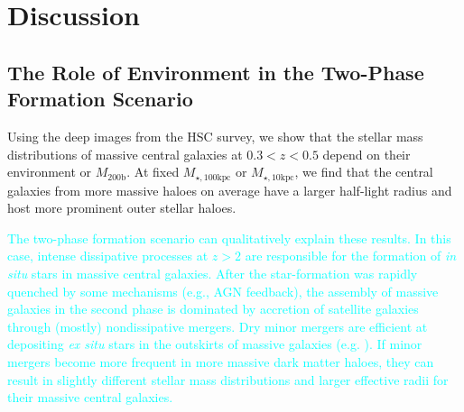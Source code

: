 \documentclass[a4paper,fleqn,usenatbib]{mnras}
\def\mhalo{{$M_{\mathrm{200b}}$}}
\def\minn{{$M_{\star,10\mathrm{kpc}}$}}
\def\mtot{{$M_{\star,100\mathrm{kpc}}$}}
\newcommand{\song}[1]{\textcolor{cyan}{#1}}
\begin{document}

\section{Discussion}
    \label{sec:discussion}

\subsection{The Role of Environment in the Two-Phase Formation Scenario}
            
    Using the deep images from the HSC survey, we show that the stellar mass 
    distributions of massive central galaxies at $0.3 < z < 0.5$ depend on their 
    environment or \mhalo{}. 
    At fixed \mtot{} or \minn{}, we find that the central galaxies from more massive 
    haloes on average have a larger half-light radius and host more prominent outer 
    stellar haloes. 
    
    \song{
    The two-phase formation scenario can qualitatively explain these results. 
    In this case, intense dissipative processes at $z > 2$ are 
    responsible for the formation of \textit{in situ} stars in massive central 
    galaxies. 
    After the star-formation was rapidly quenched by some mechanisms (e.g., AGN 
    feedback), the assembly of massive galaxies in the second phase is dominated 
    by accretion of satellite galaxies through (mostly) nondissipative mergers. 
    Dry minor mergers are efficient at depositing \textit{ex situ} stars in the 
    outskirts of massive galaxies (e.g. \citealt{Oogi2013, Bedorf2013}). 
    If minor mergers become more frequent in more massive dark matter haloes, 
    they can result in slightly different stellar mass distributions and larger 
    effective radii for their massive central galaxies.
    }
      
\end{document}
